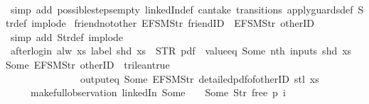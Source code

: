 \begin{isabellebody}
%
\isadelimproof
\ \ %
\endisadelimproof
%
\isatagproof
{}\isamarkupfalse%
\ {\isacharparenleft}simp\ add{\isacharcolon}\ possible{\isacharunderscore}steps{\isacharunderscore}empty\ linkedIn{\isacharunderscore}def\ can{\isacharunderscore}take\ transitions\ apply{\isacharunderscore}guards{\isacharunderscore}def\ Str{\isacharunderscore}def\ implode{\isacharparenright}%
\endisatagproof
{\isafoldproof}%
%
\isadelimproof
\isanewline
%
\endisadelimproof
\isanewline
{}\isamarkupfalse%
\ friend{\isacharunderscore}not{\isacharunderscore}other{\isacharcolon}\ {\isachardoublequoteopen}EFSM{\isachardot}Str\ {\isacharprime}{\isacharprime}friendID{\isacharprime}{\isacharprime}\ {\isasymnoteq}\ EFSM{\isachardot}Str\ {\isacharprime}{\isacharprime}otherID{\isacharprime}{\isacharprime}{\isachardoublequoteclose}\isanewline
%
\isadelimproof
\ \ %
\endisadelimproof
%
\isatagproof
{}\isamarkupfalse%
\ {\isacharparenleft}simp\ add{\isacharcolon}\ Str{\isacharunderscore}def\ implode{\isacharparenright}%
\endisatagproof
{\isafoldproof}%
%
\isadelimproof
\isanewline
%
\endisadelimproof
\isanewline
{}\isamarkupfalse%
\ after{\isacharunderscore}login{\isacharcolon}\ {\isachardoublequoteopen}alw\ {\isacharparenleft}{\isasymlambda}xs{\isachardot}\ label\ {\isacharparenleft}shd\ xs{\isacharparenright}\ {\isacharequal}\ STR\ {\isacharprime}{\isacharprime}pdf{\isacharprime}{\isacharprime}\ {\isasymand}\ value{\isacharunderscore}eq\ {\isacharparenleft}Some\ {\isacharparenleft}nth\ {\isacharparenleft}inputs\ {\isacharparenleft}shd\ xs{\isacharparenright}{\isacharparenright}\ {}{\isacharparenright}{\isacharparenright}\ {\isacharparenleft}Some\ {\isacharparenleft}EFSM{\isachardot}Str\ {\isacharprime}{\isacharprime}otherID{\isacharprime}{\isacharprime}{\isacharparenright}{\isacharparenright}\ {\isacharequal}\ trilean{\isachardot}true\ {\isasymlongrightarrow}\isanewline
\ \ \ \ \ \ \ \ \ \ \ \ \ \ {\isasymnot}\ output{\isacharunderscore}eq\ {\isacharbrackleft}Some\ {\isacharparenleft}EFSM{\isachardot}Str\ {\isacharprime}{\isacharprime}detailed{\isacharunderscore}pdf{\isacharunderscore}of{\isacharunderscore}otherID{\isacharprime}{\isacharprime}{\isacharparenright}{\isacharbrackright}\ {\isacharparenleft}stl\ xs{\isacharparenright}{\isacharparenright}\isanewline
\ \ \ \ \ {\isacharparenleft}make{\isacharunderscore}full{\isacharunderscore}observation\ linkedIn\ {\isacharparenleft}Some\ {}{\isacharparenright}\ {\isacharparenleft}{\isacharless}{\isachargreater}{\isacharparenleft}{}\ {\isachardollar}{\isacharcolon}{\isacharequal}\ Some\ {\isacharparenleft}Str\ {\isacharprime}{\isacharprime}free{\isacharprime}{\isacharprime}{\isacharparenright}{\isacharparenright}{\isacharparenright}\ p\ i{\isacharparenright}{\isachardoublequoteclose}\isanewline

\end{isabellebody}
